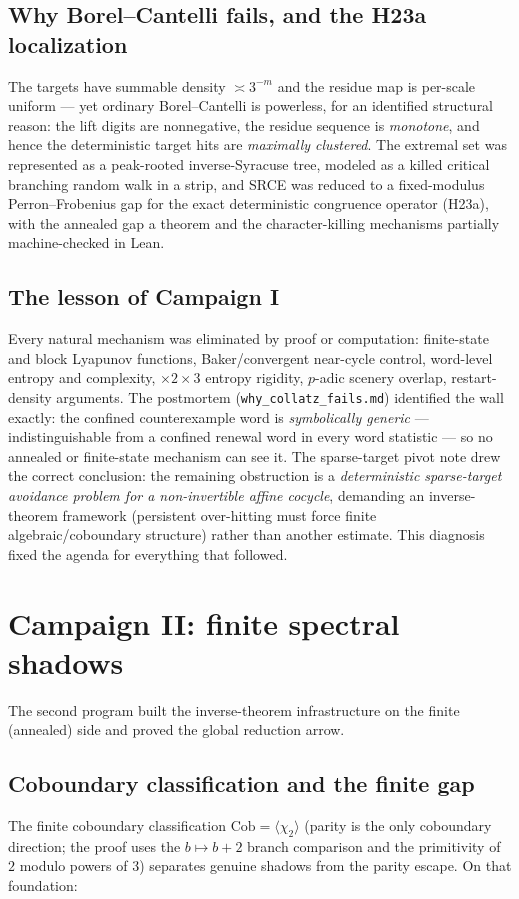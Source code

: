 \documentclass[11pt]{article}
\newcommand{\Cob}{\mathrm{Cob}}
\begin{document}
\subsection{Why Borel--Cantelli fails, and the H23a localization}
The targets have summable density $\asymp3^{-m}$ and the residue map
is per-scale uniform --- yet ordinary Borel--Cantelli is powerless,
for an identified structural reason: the lift digits are nonnegative,
the residue sequence is \emph{monotone}, and hence the deterministic
target hits are \emph{maximally clustered}.  The extremal set was
represented as a peak-rooted inverse-Syracuse tree, modeled as a
killed critical branching random walk in a strip, and SRCE was reduced
to a fixed-modulus Perron--Frobenius gap for the exact deterministic
congruence operator (H23a), with the annealed gap a theorem and the
character-killing mechanisms partially machine-checked in Lean.

\subsection{The lesson of Campaign I}
Every natural mechanism was eliminated by proof or computation:
finite-state and block Lyapunov functions, Baker/convergent
near-cycle control, word-level entropy and complexity,
$\times2\times3$ entropy rigidity, $p$-adic scenery overlap,
restart-density arguments.  The postmortem
(\texttt{why\_collatz\_fails.md}) identified the wall exactly: the
confined counterexample word is \emph{symbolically generic} ---
indistinguishable from a confined renewal word in every word
statistic --- so no annealed or finite-state mechanism can see it.
The sparse-target pivot note drew the correct conclusion: the
remaining obstruction is a \emph{deterministic sparse-target avoidance
problem for a non-invertible affine cocycle}, demanding an
inverse-theorem framework (persistent over-hitting must force finite
algebraic/coboundary structure) rather than another estimate.  This
diagnosis fixed the agenda for everything that followed.

\section{Campaign II: finite spectral shadows}

The second program built the inverse-theorem infrastructure on the
finite (annealed) side and proved the global reduction arrow.

\subsection{Coboundary classification and the finite gap}
The finite coboundary classification $\Cob=\langle\chi_2\rangle$
(parity is the only coboundary direction; the proof uses the
$b\mapsto b+2$ branch comparison and the primitivity of $2$ modulo
powers of $3$) separates genuine shadows from the parity escape.  On
that foundation:
\end{document}
